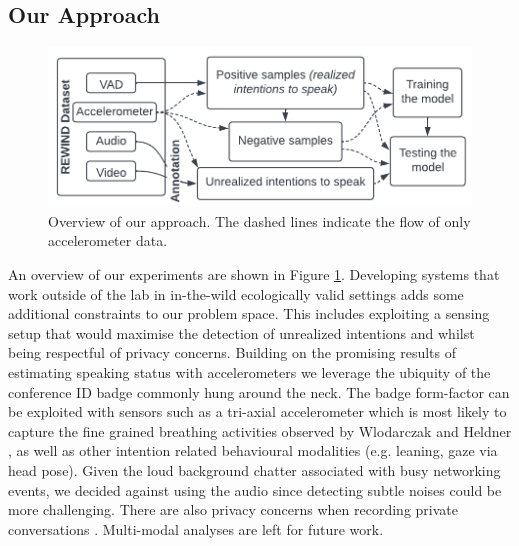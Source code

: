 \documentclass[manuscript,screen,review]{acmart}
\begin{document}
\subsection{Our Approach} 
\begin{figure}[bt]
  \includegraphics[width=0.6\columnwidth]{samples/INTS_overview (6).png}
  \vspace{-5mm}
  \caption{Overview of our approach. The dashed lines indicate the flow of only accelerometer data. 
}  \vspace{-6mm}

  \label{fig:overview}
\end{figure}
An overview of our experiments are shown in Figure \ref{fig:overview}. 
Developing systems that work outside of the lab in in-the-wild ecologically valid settings adds some additional constraints to our problem space. This includes exploiting a sensing setup that would maximise the detection of unrealized intentions and  whilst being respectful of privacy concerns. Building on the promising results of estimating speaking status with accelerometers \cite{raman2022conflab,rewinddata} we leverage the ubiquity of the conference ID badge commonly hung around the neck. The badge form-factor can be exploited with sensors such as a tri-axial accelerometer which is most likely to capture the fine grained breathing activities observed by Wlodarczak and Heldner \cite{wlodarczak2020breathing}, as well as other intention related behavioural modalities (e.g. leaning, gaze via head pose). 
Given the loud background chatter associated with busy networking events, we decided against using the audio since detecting subtle noises could be more challenging. There are also privacy concerns when recording private conversations \cite{raman2022conflab,MnM2021_underline}. Multi-modal analyses are left for future work. 
\end{document}
